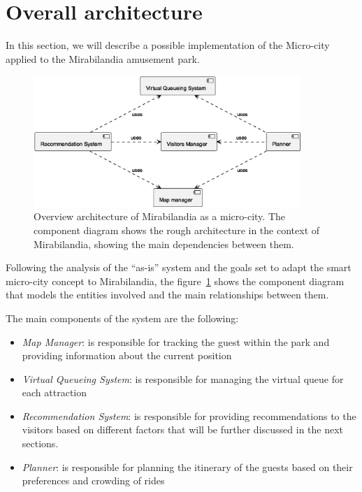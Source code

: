 \section{Overall architecture}\label{sec:mira-microcity}

In this section, we will describe a possible implementation of the Micro-city applied to the Mirabilandia amusement park.

\begin{figure}[H]
	\centering
	\includegraphics[width=0.9\textwidth]{img/architecture-overview.eps}
	\caption{Overview architecture of Mirabilandia as a micro-city.
		The component diagram shows the rough architecture in the context of Mirabilandia, showing the main dependencies between them.
	}
	\label{fig:architecture-overview}
\end{figure}

Following the analysis of the ``as-is'' system and the goals set %
to adapt the smart micro-city concept to Mirabilandia, the figure~\ref{fig:architecture-overview} shows the component diagram that models the entities involved and the main relationships between them.

The main components of the system are the following:

\begin{itemize}
	\item \textit{Map Manager}: is responsible for tracking the guest within the park and providing information about the current position
	\item \textit{Virtual Queueing System}: is responsible for managing the virtual queue for each attraction
	\item \textit{Recommendation System}: is responsible for providing recommendations to the visitors based on different factors that will be further discussed in the next sections.
	\item \textit{Planner}: is responsible for planning the itinerary of the guests based on their preferences and crowding of rides
\end{itemize}

